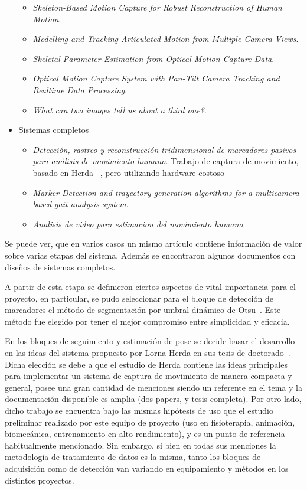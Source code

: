 \begin{itemize}
	\begin{itemize}
		\item \emph{Skeleton-Based Motion Capture for Robust Reconstruction of Human Motion}\cite{herda}.
		\item \emph{Modelling and Tracking Articulated Motion from Multiple Camera Views}\cite{ringer2000modelling}.
		\item \emph{Skeletal Parameter Estimation from Optical Motion Capture Data}\cite{kirk2005skeletal}.
		\item \emph{Optical Motion Capture System with Pan-Tilt Camera Tracking and  Realtime Data Processing}\cite{kurihara2002optical}.
		\item \emph{What can two images tell us about a third one?}\cite{faugueras}.
	\end{itemize}
	\item Sistemas completos
	\begin{itemize}
		\item \emph{Detección, rastreo y reconstrucción tridimensional de marcadores pasivos para análisis de movimiento humano}\cite{colombianos}.	Trabajo de captura de movimiento, basado en Herda ~\cite{herda}, pero utilizando hardware costoso
		\item \emph{Marker Detection and trayectory generation algorithms for a multicamera based gait analysis system}.
		\item \emph{Analisis de video para estimacion del movimiento humano}.
	\end{itemize}
\end{itemize}

Se puede ver, que en varios casos un mismo artículo contiene información de valor sobre varias etapas del sistema. Además se encontraron algunos documentos con diseños de sistemas completos.

A partir de esta etapa se definieron ciertos aspectos de vital importancia para el proyecto, en particular, se pudo seleccionar para el bloque de detección de marcadores el método de segmentación por umbral dinámico de Otsu~\cite{otsu}. Este método fue elegido por tener el mejor compromiso entre simplicidad y eficacia.

En los bloques de seguimiento y estimación de pose se decide basar el desarrollo en las ideas del sistema propuesto por Lorna Herda en sus tesis de doctorado~\cite{herda}. Dicha elección se debe a que el estudio de Herda contiene las ideas principales para implementar un sistema de captura de movimiento de manera compacta y general, posee una gran cantidad de menciones siendo un referente en el tema y la documentación disponible es amplia (dos papers, y tesis completa). Por otro lado, dicho trabajo se encuentra bajo las mismas hipótesis de uso que el estudio preliminar realizado por este equipo de proyecto (uso en fisioterapia, animación, biomecánica, entrenamiento en alto rendimiento), y es un punto de referencia habitualmente mencionado. Sin embargo, si bien en todas sus menciones la metodología de tratamiento de datos es la misma, tanto los bloques de adquisición como de detección van variando en equipamiento y métodos en los distintos proyectos.